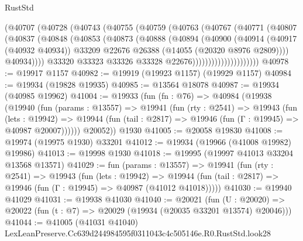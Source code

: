 \begin{lexlean}{RustStd}
\begin{coremodule}
                        (@40707
                          (@40728
                            (@40743
                              (@40755
                                (@40759
                                  (@40763
                                    (@40767
                                      (@40771
                                        (@40807
                                          (@40837
                                            (@40848
                                              (@40853
                                                (@40873
                                                  (@40888
                                                    (@40894
                                                      (@40900
                                                        (@40914
                                                          (@40917 (@40932 @40934))
                                                          @33209
                                                          @22676
                                                          @26388
                                                          (@14055 (@20320 @8976 @2809))))
                                                      @40934))))
                                              @33320
                                              @33323
                                              @33326
                                              @33328
                                              @22676)))))))))))))))))))))
@40978 := @19917 @1157
@40982 := @19919 (@19923 @1157) (@19929 @1157)
@40984 := @19934 (@19828 @19935)
@40985 := @13564 @18078
@40987 := @19934 (@40985 @19962)
@41004 := @19933
    (fun (fn : @76) =>
    @40984
      (@19938
        (@19940
          (fun (params : @13557) =>
          @19941
            (fun (rty : @2541) =>
            @19943
              (fun (lets : @19942) =>
              @19944 (fun (tail : @2817) => @19946 (fun (Γ : @19945) => @40987 @20007))))))
        @20052))
    @1930
@41005 := @20058 @19830
@41008 := @19974 (@19975 @1930) @33201
@41012 := @19934 (@19966 (@41008 @19982) @19986)
@41013 := @19998 @1930
@41018 := @19995 (@19997 @41013 @33204 @13568 @13571)
@41029 := fun (params : @13557) =>
  @19941
    (fun (rty : @2541) =>
    @19943
      (fun (lets : @19942) =>
      @19944 (fun (tail : @2817) => @19946 (fun (Γ : @19945) => @40987 (@41012 @41018)))))
@41030 := @19940 @41029
@41031 := @19938 @41030
@41040 := @20021
    (fun (U : @20020) => @20022 (fun (t : @7) => @20029 (@19934 (@20035 @33201 @13574) @20046)))
@41044 := @41005 (@41031 @41040) LexLeanPreserve.Cc639d244984595f0311043c4c505146e.R0.RustStd.look28

\end{coremodule}
\end{lexlean}
